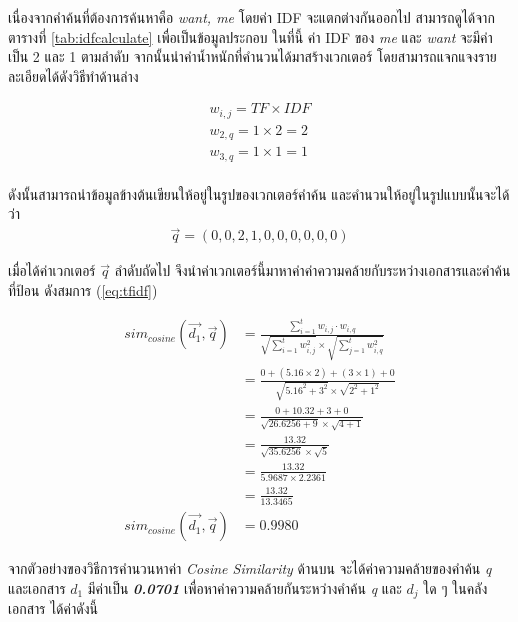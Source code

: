 \documentclass[11pt,a4paper]{article}
\begin{document}
{{{เนื่องจากคำค้นที่ต้องการค้นหาคือ \emph{want, me} โดยค่า IDF จะแตกต่างกันออกไป สามารถดูได้จากตารางที่ \ref{tab:idfcalculate} เพื่อเป็นข้อมูลประกอบ ในที่นี้ ค่า IDF ของ \emph{me} และ \emph{want} จะมีค่าเป็น 2 และ 1 ตามลำดับ จากนั้นนำค่าน้ำหนักที่คำนวนได้มาสร้างเวกเตอร์ โดยสามารถแจกแจงรายละเอียดได้ดังวิธีทำด้านล่าง

\begin{align*}
    w_{i,j} = TF \times IDF \\
    w_{2,q} = 1  \times 2 = 2 \\
    w_{3,q} = 1 \times 1 = 1 \\
\end{align*}

ดังนั้นสามารถนำข้อมูลข้างต้นเขียนให้อยู่ในรูปของเวกเตอร์คำค้น และคำนวนให้อยู่ในรูปแบบนั้นจะได้ว่า 
\begin{align*}
    \overrightarrow{q} = (0, 0, 2, 1, 0, 0, 0, 0, 0, 0)
\end{align*}

เมื่อได้ค่าเวกเตอร์ $\overrightarrow{q}$ ลำดับถัดไป จึงนำค่าเวกเตอร์นี้มาหาค่าค่าความคล้ายกับระหว่างเอกสารและคำค้นที่ป้อน ดังสมการ ({\ref{eq:tfidf}}) 

\begin{align*}
    sim_{cosine}(\overrightarrow{d_{1}}, \overrightarrow{q}) & = \frac{\sum_{i=1}^{t} w_{i,j} \cdot w_{i,q}}{\sqrt{\sum_{i=1}^{t} w_{i,j}^2} \times \sqrt{\sum_{j=1}^{t} w_{i,q}^2}} \\
    &= \frac{0 + (5.16 \times 2) + (3 \times 1)  + 0}{\sqrt{5.16^{2} + 3^2} \times \sqrt{2^2 + 1^2}} \\
    &= \frac{0 + 10.32 + 3 + 0}{\sqrt{26.6256 + 9} \times \sqrt{4 + 1}} \\
    &= \frac{13.32}{\sqrt{35.6256} \times \sqrt{5}} \\
    &= \frac{13.32}{5.9687 \times 2.2361} \\
    &= \frac{13.32}{13.3465} \\
    sim_{cosine}(\overrightarrow{d_{1}}, \overrightarrow{q}) &= 0.9980 
\end{align*}

จากตัวอย่างของวิธีการคำนวนหาค่า \emph{Cosine Similarity} ด้านบน จะได้ค่าความคล้ายของคำค้น \emph{q} 
และเอกสาร \emph{$d_{1}$} มีค่าเป็น {\bf \emph{0.0701}} เพื่อหาค่าความคล้ายกันระหว่างคำค้น \emph{q} และ \emph{$d_{j}$} ใด ๆ ในคลังเอกสาร ได้ค่าดังนี้

}}}
\end{document}
